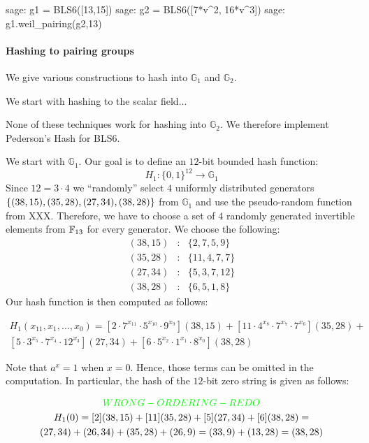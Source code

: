\begin{sagecommandline}
sage: g1 = BLS6([13,15])
sage: g2 = BLS6([7*v^2, 16*v^3])
sage: g1.weil_pairing(g2,13)
\end{sagecommandline}

\paragraph{Hashing to pairing groups}
We give various constructions to hash into $\mathbb{G}_1$ and $\mathbb{G}_2$. 

We start with hashing to the scalar field... 

None of these techniques work for hashing into $\mathbb{G}_2$. We therefore implement Pederson's Hash for BLS6. 

We start with $\mathbb{G}_1$. Our goal is to define an $12$-bit bounded hash function:
$$
H_{1}: \{0,1\}^{12} \to \mathbb{G}_1 
$$
Since $12= 3\cdot 4$ we ``randomly'' select $4$ uniformly distributed generators $\{(38, 15), (35,28),\\ (27, 34), (38, 28)\}$ from $\mathbb{G}_1$ and use the pseudo-random function from XXX. 
Therefore, we have to choose a set of $4$ randomly generated invertible elements from $\mathbb{F}_{13}$ for every generator. We choose the following:
$$
\begin{array}{lcl}
(38,15) &:& \{2,7,5,9\}\\
(35,28) &:& \{11,4,7,7\}\\
(27,34) &:& \{5,3,7,12\}\\
(38,28) &:& \{6,5,1,8\}
\end{array}
$$
Our hash function is then computed as follows:

\begin{multline*}
H_1(x_{11},x_1,\ldots, x_{0})=
[2\cdot 7^{x_{11}}\cdot 5^{x_{10}}\cdot 9^{x_9}](38,15)+
[11\cdot 4^{x_8}\cdot 7^{x_7}\cdot 7^{x_6}](35,28)+\\
[5\cdot 3^{x_5}\cdot 7^{x_4}\cdot 12^{x_3}](27,34) +
[6\cdot 5^{x_2}\cdot 1^{x_{1}}\cdot 8^{x_{0}}](38,28)
\end{multline*}

Note that $a^x=1$ when $x=0$. Hence, those terms can be omitted in the computation. 
In particular, the hash of the $12$-bit zero string is given as follows:

\begin{multline*}\textcolor{green}{WRONG-ORDERING-REDO}\\
H_1(0)= [2](38,15)+[11](35,28)+[5](27,34)+[6](38,28)= \\
(27,34)+(26,34)+(35,28)+(26,9)= (33,9) + (13,28) = (38,28)
\end{multline*}

